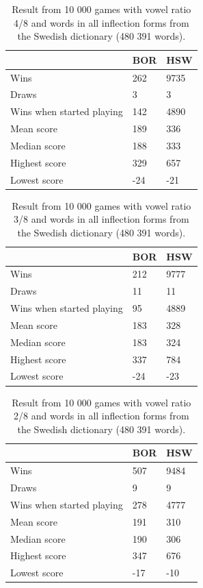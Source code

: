 \documentclass[a4paper, 12pt]{report}
\begin{document}
\begin{table}[h]
\centering
    \begin{tabular}{ l | l | l }
   	& BOR & HSW \\
   	\hline
   	Wins & 262 & 9735 \\
	Draws & 3 & 3 \\
	Wins when started playing & 142 & 4890 \\   	
	Mean score & 189 & 336  \\
	Median score & 188 & 333 \\	 	 
	Highest score & 329 & 657 \\
	Lowest score & -24 & -21\\		
    \end{tabular}
\caption{Result from 10 000 games with vowel ratio 4/8 and words in all inflection forms from the Swedish dictionary (480 391 words).}
\label{tab:borhswstats4}
\end{table}

\begin{table}[h]
\centering
    \begin{tabular}{ l | l | l }
   	& BOR & HSW \\
   	\hline
   	Wins & 212 & 9777 \\
	Draws & 11 & 11 \\
	Wins when started playing & 95 & 4889 \\   	
	Mean score & 183 & 328  \\
	Median score & 183 & 324 \\	 	 
	Highest score & 337 & 784 \\
	Lowest score & -24 & -23\\		
    \end{tabular}
\caption{Result from 10 000 games with vowel ratio 3/8 and words in all inflection forms from the Swedish dictionary (480 391 words).}
\label{tab:borhswstats3}
\end{table}

\begin{table}[h]
\centering
    \begin{tabular}{ l | l | l }
   	& BOR & HSW \\
   	\hline
   	Wins & 507 & 9484 \\
	Draws & 9 & 9 \\
	Wins when started playing & 278 & 4777 \\   	
	Mean score & 191 & 310 \\
	Median score & 190 & 306 \\	 	 
	Highest score & 347 & 676 \\
	Lowest score & -17 & -10 \\		
    \end{tabular}
\caption{Result from 10 000 games with vowel ratio 2/8 and words in all inflection forms from the Swedish dictionary (480 391 words).}
\label{tab:borhswstats2}
\end{table}
\end{document}
